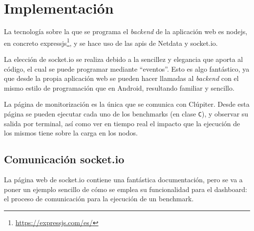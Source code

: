 \section{Implementación}
La tecnología sobre la que se programa el \textit{\gls{backend}} de la aplicación web es nodejs, en concreto expressjs\footnote{\url{https://expressjs.com/es/}}, y se hace uso de las \acrshort{api}s de Netdata y socket.io.

La elección de socket.io se realiza debido a la sencillez y elegancia que aporta al código, el cual se puede programar mediante ``eventos''. Esto es algo fantástico, ya que desde la propia aplicación web se pueden hacer llamadas al \textit{\gls{backend}} con el mismo estilo de programación que en Android, resultando familiar y sencillo.

La página de monitorización es la única que se comunica con Clúpiter. Desde esta página se pueden ejecutar cada uno de los benchmarks (en clase \texttt{C}), y observar su salida por terminal, así como ver en tiempo real el impacto que la ejecución de los mismos tiene sobre la carga en los nodos.

\subsection{Comunicación socket.io}
\label{ssec:socket.io_comm}
La página web de socket.io contiene una fantástica documentación, pero se va a poner un ejemplo sencillo de cómo se emplea su funcionalidad para el dashboard: el proceso de comunicación para la ejecución de un benchmark.


